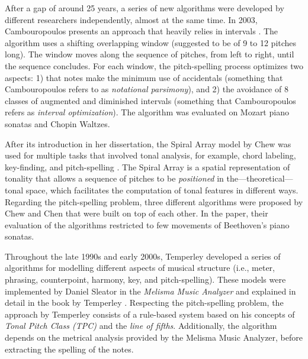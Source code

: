 After a gap of around 25 years, a series of new algorithms
were developed by different researchers independently,
almost at the same time. In 2003, Cambouropoulos presents an
approach that heavily relies in intervals
\parencite{cambouropoulos2003pitch}. The algorithm uses a
shifting overlapping window (suggested to be of 9 to 12
pitches long). The window moves along the sequence of
pitches, from left to right, until the sequence concludes.
For each window, the pitch-spelling process optimizes two
aspects: 1) that notes make the minimum use of accidentals
(something that Cambouropoulos refers to as \emph{notational
parsimony}), and 2) the avoidance of 8 classes of augmented
and diminished intervals (something that Cambouropoulos
refers as \emph{interval optimization}). The algorithm was
evaluated on Mozart piano sonatas and Chopin Waltzes.

After its introduction in her dissertation, the Spiral Array
model by Chew was used for multiple tasks that involved
tonal analysis, for example, chord labeling, key-finding,
and pitch-spelling \parencite{chew2000towards}. The Spiral
Array is a spatial representation of tonality that allows a
sequence of pitches to be \emph{positioned} in
the---theoretical---tonal space, which facilitates the
computation of tonal features in different ways. Regarding
the pitch-spelling problem, three different algorithms were
proposed by Chew and Chen \parencite{chew2003determining}
that were built on top of each other. In the paper, their
evaluation of the algorithms restricted to few movements of
Beethoven's piano sonatas.

Throughout the late 1990s and early 2000s, Temperley
developed a series of algorithms for modelling different
aspects of musical structure (i.e., meter, phrasing,
counterpoint, harmony, key, and pitch-spelling). These
models were implemented by Daniel Sleator in the
\emph{Melisma Music Analyzer} and explained in detail in the
book by Temperley \parencite{temperley2004cognition}.
Respecting the pitch-spelling problem, the approach by
Temperley consists of a rule-based system based on his
concepts of \emph{Tonal Pitch Class (TPC)} and the
\emph{line of fifths}. Additionally, the algorithm depends
on the metrical analysis provided by the Melisma Music
Analyzer, before extracting the spelling of the notes.

